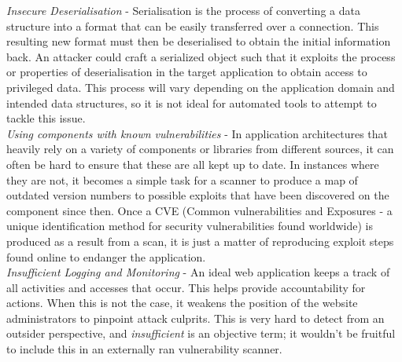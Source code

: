 	\emph{Insecure Deserialisation} - Serialisation is the process of converting a data structure into a format that can be easily transferred over a connection. This resulting new format must then be deserialised to obtain the initial information back. An attacker could craft a serialized object such that it exploits the process or properties of deserialisation in the target application to obtain access to privileged data. This process will vary depending on the application domain and intended data structures, so it is not ideal for automated tools to attempt to tackle this issue. \\ 
	
	\emph{Using components with known vulnerabilities} - In application architectures that heavily rely on a variety of components or libraries from different sources, it can often be hard to ensure that these are all kept up to date. In instances where they are not, it becomes a simple task for a scanner to produce a map of outdated version numbers to possible exploits that have been discovered on the component since then. Once a CVE (Common vulnerabilities and Exposures - a unique identification method for security vulnerabilities found worldwide) is produced as a result from a scan, it is just a matter of reproducing exploit steps found online to endanger the application. \\ 
	
	\emph{Insufficient Logging and Monitoring} - An ideal web application keeps a track of all activities and accesses that occur. This helps provide accountability for actions. When this is not the case, it weakens the position of the website administrators to pinpoint attack culprits. This is very hard to detect from an outsider perspective, and \textit{insufficient} is an objective term; it wouldn't be fruitful to include this in an externally ran vulnerability scanner. \\
	
